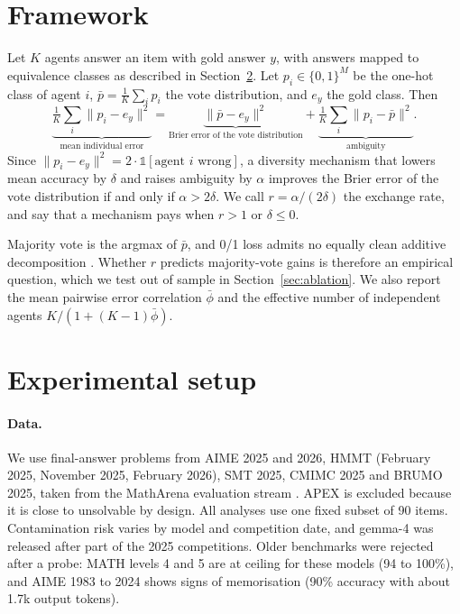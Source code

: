 \documentclass[11pt]{article}
\begin{document}
\section{Framework}\label{sec:framework}
Let $K$ agents answer an item with gold answer $y$, with answers mapped to equivalence classes
as described in Section~\ref{sec:setup}. Let $p_i\in\{0,1\}^M$ be the one-hot class of agent $i$,
$\bar p=\frac1K\sum_i p_i$ the vote distribution, and $e_y$ the gold class. Then
\begin{equation}
\underbrace{\tfrac1K\textstyle\sum_i\|p_i-e_y\|^2}_{\text{mean individual error}}
=\underbrace{\|\bar p-e_y\|^2}_{\text{Brier error of the vote distribution}}
+\underbrace{\tfrac1K\textstyle\sum_i\|p_i-\bar p\|^2}_{\text{ambiguity}} .
\end{equation}
Since $\|p_i-e_y\|^2=2\cdot\mathbb 1[\text{agent } i\text{ wrong}]$, a diversity mechanism that
lowers mean accuracy by $\delta$ and raises ambiguity by $\alpha$ improves the Brier error of the
vote distribution if and only if $\alpha>2\delta$. We call $r=\alpha/(2\delta)$ the exchange
rate, and say that a mechanism pays when $r>1$ or $\delta\le 0$.

Majority vote is the argmax of $\bar p$, and 0/1 loss admits no equally clean additive
decomposition \citep{wood2023unified}. Whether $r$ predicts majority-vote gains is therefore an
empirical question, which we test out of sample in Section~\ref{sec:ablation}. We also report
the mean pairwise error correlation $\bar\phi$ and the effective number of independent agents
$K/(1+(K-1)\bar\phi)$.

\section{Experimental setup}\label{sec:setup}
\paragraph{Data.} We use final-answer problems from AIME 2025 and 2026, HMMT (February 2025,
November 2025, February 2026), SMT 2025, CMIMC 2025 and BRUMO 2025, taken from the MathArena
evaluation stream \citep{balunovic2025matharena}. APEX is excluded because it is close to
unsolvable by design. All analyses use one fixed subset of 90 items. Contamination risk varies
by model and competition date, and gemma-4 was released after part of the 2025 competitions.
Older benchmarks were rejected after a probe: MATH levels 4 and 5 are at ceiling for these
models (94 to 100\%), and AIME 1983 to 2024 shows signs of memorisation (90\% accuracy with about
1.7k output tokens).
\end{document}
